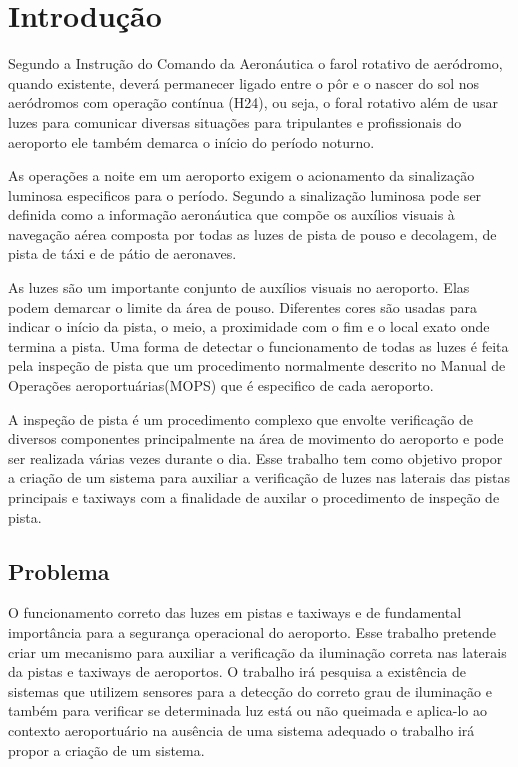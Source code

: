 \chapter{Introdução} \label{Introducao}

Segundo a Instrução do Comando da Aeronáutica \cite{ICA:100-37} o farol rotativo de aeródromo, quando existente, deverá permanecer ligado entre o pôr e
o nascer do sol nos aeródromos com operação contínua (H24), ou seja, o foral rotativo além de usar luzes para comunicar diversas situações para tripulantes e profissionais do aeroporto ele também demarca o início do período noturno. 

As operações a noite em um aeroporto exigem o acionamento da sinalização luminosa especificos para o período. Segundo \cite{RBAC:154} a sinalização luminosa pode ser definida como a informação aeronáutica que compõe os auxílios visuais
à navegação aérea composta por todas as luzes de pista de pouso e decolagem, de pista de táxi e de pátio de aeronaves.

As luzes são um importante conjunto de auxílios visuais no aeroporto. Elas podem demarcar o limite da área de pouso. Diferentes cores são usadas para indicar o início da pista, o meio, a proximidade com o fim e o local exato onde termina a pista. Uma forma de detectar o funcionamento de todas as luzes é feita pela inspeção de pista que um procedimento normalmente descrito no Manual de Operações aeroportuárias(MOPS) que é especifico de cada aeroporto. 

A inspeção de pista é um procedimento complexo que envolte verificação de diversos componentes principalmente na área de movimento do aeroporto e pode ser realizada várias vezes durante o dia. Esse trabalho tem como objetivo propor a criação de um sistema para auxiliar a verificação de luzes nas laterais das pistas principais e taxiways com a finalidade de auxilar o procedimento de inspeção de pista.


\section{Problema}

O funcionamento correto das luzes em pistas e taxiways e de fundamental importância para a segurança operacional do aeroporto. Esse trabalho pretende criar um mecanismo para auxiliar a verificação da iluminação correta nas laterais da pistas e taxiways de aeroportos. O trabalho irá pesquisa a existência de sistemas que utilizem sensores para a detecção do correto grau de iluminação e também para verificar se determinada luz está ou não queimada e aplica-lo ao contexto aeroportuário na ausência de uma sistema adequado o trabalho irá propor a criação de um sistema. 

